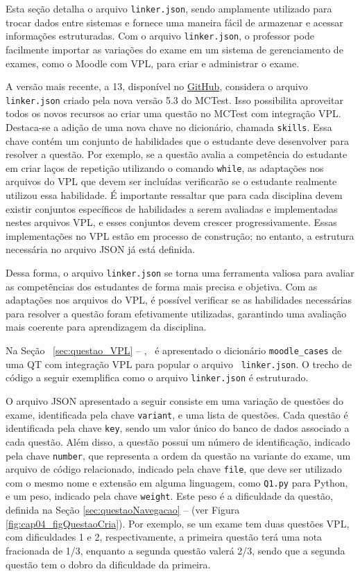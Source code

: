 Esta seção detalha o arquivo \verb|linker.json|, sendo amplamente utilizado para trocar dados entre sistemas e fornece uma maneira fácil de armazenar e acessar informações estruturadas. Com o arquivo \verb|linker.json|, o professor pode facilmente importar as variações do exame em um sistema de gerenciamento de exames, como o Moodle com VPL, para criar e administrar o exame.

A versão mais recente, a 13, disponível no \href{https://github.com/fzampirolli/mctest/tree/master/VPL_modification/V13-Moodle_v4.1}{GitHub}, considera o arquivo \verb|linker.json| criado pela nova versão 5.3 do MCTest. Isso possibilita aproveitar todos os novos recursos ao criar uma questão no MCTest com integração VPL. Destaca-se a adição de uma nova chave no dicionário, chamada \verb|skills|. Essa chave contém um conjunto de habilidades que o estudante deve desenvolver para resolver a questão. Por exemplo, se a questão avalia a competência do estudante em criar laços de repetição utilizando o comando \verb|while|, as adaptações nos arquivos do VPL que devem ser incluídas verificarão se o estudante realmente utilizou essa habilidade. É importante ressaltar que para cada disciplina devem existir conjuntos específicos de habilidades a serem avaliadas e implementadas nestes arquivos VPL, e esses conjuntos devem crescer progressivamente. Essas implementações no VPL estão em processo de construção; no entanto, a estrutura necessária no arquivo JSON já está definida.

Dessa forma, o arquivo \verb|linker.json| se torna uma ferramenta valiosa para avaliar as competências dos estudantes de forma mais precisa e objetiva. Com as adaptações nos arquivos do VPL, é possível verificar se as habilidades necessárias para resolver a questão foram efetivamente utilizadas, garantindo uma avaliação mais coerente para aprendizagem da disciplina.

Na Seção \ \ref{sec:questao_VPL} -- , \ é apresentado o dicionário \verb|moodle_cases| de uma QT com integração VPL para popular o arquivo \ \verb|linker.json|. O trecho de código a seguir exemplifica como o arquivo \verb|linker.json| é estruturado.

O arquivo JSON apresentado a seguir consiste em uma variação de questões do exame, identificada pela chave \verb|variant|, e uma lista de questões. Cada questão é identificada pela chave \verb|key|, sendo um valor único do banco de dados associado a cada questão. Além disso, a questão possui um número de identificação, indicado pela chave \verb|number|, que representa a ordem da questão na variante do exame, um arquivo de código relacionado, indicado pela chave \verb|file|, que deve ser utilizado com o mesmo nome e extensão em alguma linguagem, como \verb|Q1.py| para Python, e um peso, indicado pela chave \verb|weight|. Este peso é a dificuldade da questão, definida na Seção \ref{sec:questaoNavegacao} --  (ver Figura \ref{fig:cap04_figQuestaoCria}). Por exemplo, se um exame tem duas questões VPL, com dificuldades 1 e 2, respectivamente, a primeira questão terá uma nota fracionada de 1/3, enquanto a segunda questão valerá 2/3, sendo que a segunda questão tem o dobro da dificuldade da primeira.


